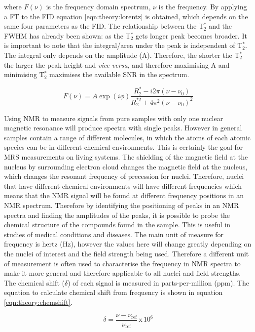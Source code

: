 \noindent where $F(\nu)$ is the frequency domain spectrum, $\nu$ is the frequency. By applying a \ac{FT} to the \ac{FID} equation \ref{eqn:theory:lorentz} is obtained, which depends on the same four parameters as the \ac{FID}. The relationship between the T$_2^*$ and the FWHM has already been shown: as the T$_2^*$ gets longer peak becomes broader. It is important to note that the integral/area under the peak is independent of T$_2^*$. The integral only depends on the amplitude (A). Therefore, the shorter the T$_2^*$ the larger the peak height and \textit{vice versa}, and therefore maximising A and minimising T$_2^*$ maximises the available \ac{SNR} in the spectrum.

\begin{equation}
    F(\nu) = A\exp(i\phi)\frac{R_2^*-i2\pi(\nu-\nu_0)}{R_2^{*2}+4\pi^2(\nu-\nu_0)^2}
    \label{eqn:theory:lorentz}
\end{equation}

Using \ac{NMR} to measure signals from pure samples with only one nuclear magnetic resonance will produce spectra with single peaks. However in general samples contain a range of different molecules, in which the atoms of each atomic species can be in different chemical environments. This is certainly the goal for \ac{MRS} measurements on living systems. The shielding of the magnetic field at the nucleus by surrounding electron cloud changes the magnetic field at the nucleus, which changes the resonant frequency of precession for nuclei. Therefore, nuclei that have different chemical environments will have different frequencies which means that the \ac{NMR} signal will be found at different frequency positions in an \ac{NMR} spectrum. Therefore by identifying the positioning of peaks in an \ac{NMR} spectra and finding the amplitudes of the peaks, it is possible to probe the chemical structure of the compounds found in the sample. This is useful in studies of medical conditions and diseases. The main unit of measure for frequency is hertz (Hz), however the values here will change greatly depending on the nuclei of interest and the field strength being used. Therefore a different unit of measurement is often used to characterise the frequency in \ac{NMR} spectra to make it more general and therefore applicable to all nuclei and field strengths. The chemical shift ($\delta$) of each signal is measured in parts-per-million (ppm). The equation to calculate chemical shift from frequency is shown in equation \ref{eqn:theory:chemshift}.

\begin{equation}
    \delta = \frac{\nu - \nu_{\textrm{ref}}}{\nu_\textrm{ref}} \, \textrm{x} \, 10^6
    \label{eqn:theory:chemshift}
\end{equation}

